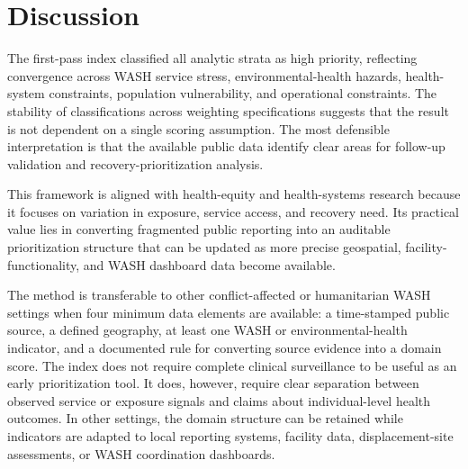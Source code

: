 \section{Discussion}

The first-pass index classified all analytic strata as high priority, reflecting convergence across WASH service stress, environmental-health hazards, health-system constraints, population vulnerability, and operational constraints. The stability of classifications across weighting specifications suggests that the result is not dependent on a single scoring assumption. The most defensible interpretation is that the available public data identify clear areas for follow-up validation and recovery-prioritization analysis.

This framework is aligned with health-equity and health-systems research because it focuses on variation in exposure, service access, and recovery need. Its practical value lies in converting fragmented public reporting into an auditable prioritization structure that can be updated as more precise geospatial, facility-functionality, and WASH dashboard data become available.

The method is transferable to other conflict-affected or humanitarian WASH settings when four minimum data elements are available: a time-stamped public source, a defined geography, at least one WASH or environmental-health indicator, and a documented rule for converting source evidence into a domain score. The index does not require complete clinical surveillance to be useful as an early prioritization tool. It does, however, require clear separation between observed service or exposure signals and claims about individual-level health outcomes. In other settings, the domain structure can be retained while indicators are adapted to local reporting systems, facility data, displacement-site assessments, or WASH coordination dashboards.
